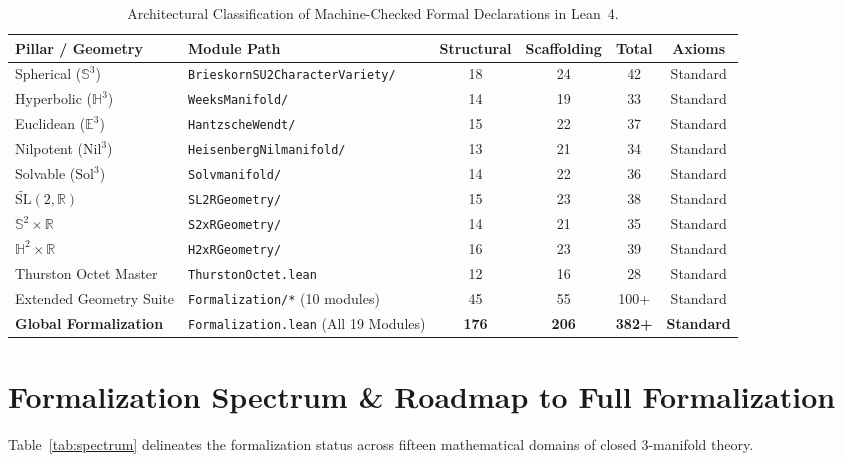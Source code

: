 \documentclass[11pt,a4paper]{article}
\begin{document}
\begin{table}[htbp]
\centering
\small
\begin{tabular}{@{}llcccc@{}}
\toprule
\textbf{Pillar / Geometry} & \textbf{Module Path} & \textbf{Structural} & \textbf{Scaffolding} & \textbf{Total} & \textbf{Axioms} \\
\midrule
Spherical ($\mathbb{S}^3$) & \texttt{BrieskornSU2CharacterVariety/} & 18 & 24 & 42 & Standard \\
Hyperbolic ($\mathbb{H}^3$) & \texttt{WeeksManifold/} & 14 & 19 & 33 & Standard \\
Euclidean ($\mathbb{E}^3$) & \texttt{HantzscheWendt/} & 15 & 22 & 37 & Standard \\
Nilpotent ($\mathrm{Nil}^3$) & \texttt{HeisenbergNilmanifold/} & 13 & 21 & 34 & Standard \\
Solvable ($\mathrm{Sol}^3$) & \texttt{Solvmanifold/} & 14 & 22 & 36 & Standard \\
$\widetilde{\mathrm{SL}}(2, \mathbb{R})$ & \texttt{SL2RGeometry/} & 15 & 23 & 38 & Standard \\
$\mathbb{S}^2 \times \mathbb{R}$ & \texttt{S2xRGeometry/} & 14 & 21 & 35 & Standard \\
$\mathbb{H}^2 \times \mathbb{R}$ & \texttt{H2xRGeometry/} & 16 & 23 & 39 & Standard \\
Thurston Octet Master & \texttt{ThurstonOctet.lean} & 12 & 16 & 28 & Standard \\
Extended Geometry Suite & \texttt{Formalization/*} (10 modules) & 45 & 55 & 100+ & Standard \\
\midrule
\textbf{Global Formalization} & \texttt{Formalization.lean} (All 19 Modules) & \textbf{176} & \textbf{206} & \textbf{382+} & \textbf{Standard} \\
\bottomrule
\end{tabular}
\caption{Architectural Classification of Machine-Checked Formal Declarations in Lean~4.}
\label{tab:declarations}
\end{table}

\section{Formalization Spectrum \& Roadmap to Full Formalization}
Table~\ref{tab:spectrum} delineates the formalization status across fifteen mathematical domains of closed 3-manifold theory.
\end{document}
